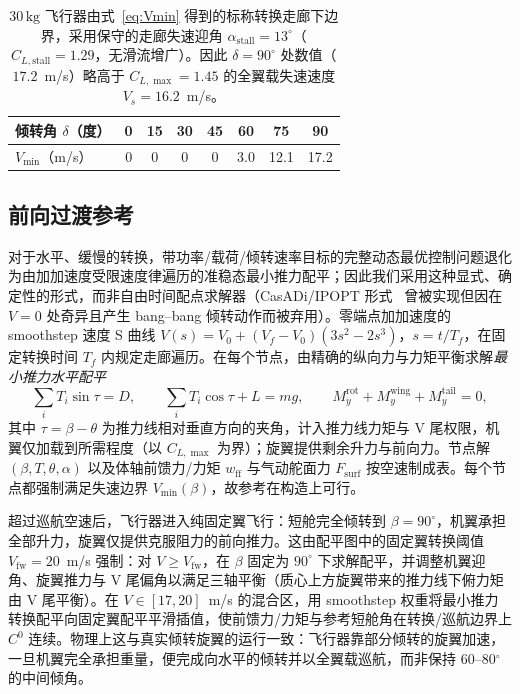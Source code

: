 \documentclass[UTF8,a4paper,11pt]{ctexart}
\newcommand{\SI}[2]{\ensuremath{#1\,#2}}
\newcommand{\kilogram}{\mathrm{kg}}
\begin{document}
\begin{table}[t]
\centering
\caption{\SI{30}{\kilogram} 飞行器由式~\eqref{eq:Vmin} 得到的标称转换走廊下边界，采用保守的走廊失速迎角 $\alpha_{\mathrm{stall}}=13^\circ$（$C_{L,\mathrm{stall}}=1.29$，无滑流增广）。因此 $\delta=90^\circ$ 处数值（$17.2$~m/s）略高于 $C_{L,\max}=1.45$ 的全翼载失速速度 $V_s=16.2$~m/s。}
\label{tab:corridor}
\small
\begin{tabular}{lccccccc}
\toprule
倾转角 $\delta$（度） & 0 & 15 & 30 & 45 & 60 & 75 & 90 \\
\midrule
$V_{\min}$（m/s） & 0 & 0 & 0 & 0 & 3.0 & 12.1 & 17.2 \\
\bottomrule
\end{tabular}
\end{table}

\subsection{前向过渡参考}\label{sec:ocp}
对于水平、缓慢的转换，带功率/载荷/倾转速率目标的完整动态最优控制问题退化为由加加速度受限速度律遍历的准稳态最小推力配平；因此我们采用这种显式、确定性的形式，而非自由时间配点求解器（CasADi/IPOPT 形式~\cite{andersson2019casadi} 曾被实现但因在 $V=0$ 处奇异且产生 bang--bang 倾转动作而被弃用）。零端点加加速度的 smoothstep 速度 S 曲线 $V(s)=V_0+(V_f-V_0)(3s^2-2s^3)$，$s=t/T_f$，在固定转换时间 $T_f$ 内规定走廊遍历。在每个节点，由精确的纵向力与力矩平衡求解\emph{最小推力水平配平}
\begin{equation}
\sum_i T_i\sin\tau = D,\qquad
\sum_i T_i\cos\tau + L = mg,\qquad
M_y^{\mathrm{rot}}+M_y^{\mathrm{wing}}+M_y^{\mathrm{tail}}=0,
\label{eq:trim}
\end{equation}
其中 $\tau=\beta-\theta$ 为推力线相对垂直方向的夹角，计入推力线力矩与 V 尾权限，机翼仅加载到所需程度（以 $C_{L,\max}$ 为界）；旋翼提供剩余升力与前向力。节点解 $(\beta,T,\theta,\alpha)$ 以及体轴前馈力/力矩 $w_{\mathrm{ff}}$ 与气动舵面力 $F_{\mathrm{surf}}$ 按空速制成表。每个节点都强制满足失速边界 $V_{\min}(\beta)$，故参考在构造上可行。

超过巡航空速后，飞行器进入纯固定翼飞行：短舱完全倾转到 $\beta=90^\circ$，机翼承担全部升力，旋翼仅提供克服阻力的前向推力。这由配平图中的固定翼转换阈值 $V_{\mathrm{fw}}=20$~m/s 强制：对 $V\ge V_{\mathrm{fw}}$，在 $\beta$ 固定为 $90^\circ$ 下求解配平，并调整机翼迎角、旋翼推力与 V 尾偏角以满足三轴平衡（质心上方旋翼带来的推力线下俯力矩由 V 尾平衡）。在 $V\in[17,20]$~m/s 的混合区，用 smoothstep 权重将最小推力转换配平向固定翼配平平滑插值，使前馈力/力矩与参考短舱角在转换/巡航边界上 $C^0$ 连续。物理上这与真实倾转旋翼的运行一致：飞行器靠部分倾转的旋翼加速，一旦机翼完全承担重量，便完成向水平的倾转并以全翼载巡航，而非保持 60--80$^\circ$ 的中间倾角。
\end{document}
